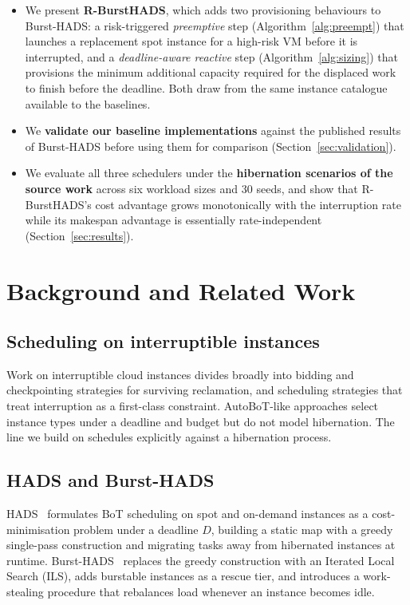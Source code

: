 \documentclass[conference]{IEEEtran}
\begin{document}
\begin{itemize}
\item We present \textbf{R-BurstHADS}, which adds two provisioning behaviours to
Burst-HADS: a risk-triggered \emph{preemptive} step (Algorithm~\ref{alg:preempt})
that launches a replacement spot instance for a high-risk VM before it is
interrupted, and a \emph{deadline-aware reactive} step
(Algorithm~\ref{alg:sizing}) that provisions the minimum additional capacity
required for the displaced work to finish before the deadline. Both draw from
the same instance catalogue available to the baselines.
\item We \textbf{validate our baseline implementations} against the published
results of Burst-HADS before using them for comparison
(Section~\ref{sec:validation}).
\item We evaluate all three schedulers under the \textbf{hibernation scenarios of
the source work} across six workload sizes and 30 seeds, and show that
R-BurstHADS's cost advantage grows monotonically with the interruption rate
while its makespan advantage is essentially rate-independent
(Section~\ref{sec:results}).
\end{itemize}

\section{Background and Related Work}

\subsection{Scheduling on interruptible instances}

Work on interruptible cloud instances divides broadly into bidding and
checkpointing strategies for surviving reclamation, and scheduling strategies
that treat interruption as a first-class constraint. AutoBoT-like approaches
select instance types under a deadline and budget but do not model hibernation.
The line we build on schedules explicitly against a hibernation process.

\subsection{HADS and Burst-HADS}

HADS~\cite{hads2021} formulates BoT scheduling on spot and on-demand instances
as a cost-minimisation problem under a deadline $D$, building a static map with
a greedy single-pass construction and migrating tasks away from hibernated
instances at runtime. Burst-HADS~\cite{bursthads} replaces the greedy
construction with an Iterated Local Search (ILS), adds burstable instances as a
rescue tier, and introduces a work-stealing procedure that rebalances load
whenever an instance becomes idle.
\end{document}
